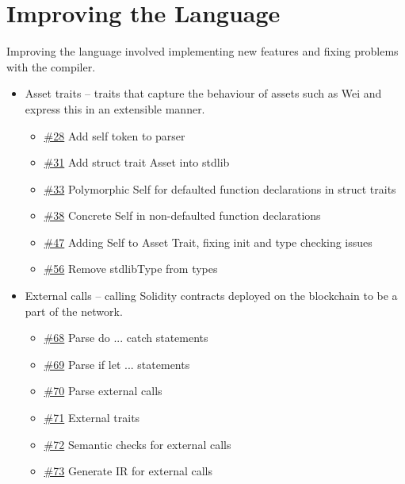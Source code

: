 \section{Improving the Language}

Improving the language involved implementing new features and fixing problems with the compiler.

\begin{itemize}
	\item Asset traits – traits that capture the behaviour of assets such as Wei and express this in an extensible manner.
	\begin{itemize}
		\item \href{https://github.com/flintrocks/flint/pull/28}{\#28} Add self token to parser
		\item \href{https://github.com/flintrocks/flint/pull/31}{\#31} Add struct trait Asset into stdlib 
		\item \href{https://github.com/flintrocks/flint/pull/33}{\#33} Polymorphic Self for defaulted function declarations in struct traits 
		\item \href{https://github.com/flintrocks/flint/pull/38}{\#38} Concrete Self in non-defaulted function declarations
		\item \href{https://github.com/flintrocks/flint/pull/47}{\#47} Adding Self to Asset Trait, fixing init and type checking issues
		\item \href{https://github.com/flintrocks/flint/pull/56}{\#56} Remove stdlibType from types
	\end{itemize}
	\item External calls – calling Solidity contracts deployed on the blockchain to be a part of the network.
	\begin{itemize}
		\item \href{https://github.com/flintrocks/flint/pull/68}{\#68} Parse do ... catch statements
		\item \href{https://github.com/flintrocks/flint/pull/69}{\#69} Parse if let ... statements
		\item \href{https://github.com/flintrocks/flint/pull/70}{\#70} Parse external calls
		\item \href{https://github.com/flintrocks/flint/pull/71}{\#71} External traits
		\item \href{https://github.com/flintrocks/flint/pull/72}{\#72} Semantic checks for external calls
		\item \href{https://github.com/flintrocks/flint/pull/73}{\#73} Generate IR for external calls

\end{itemize}
\end{itemize}
